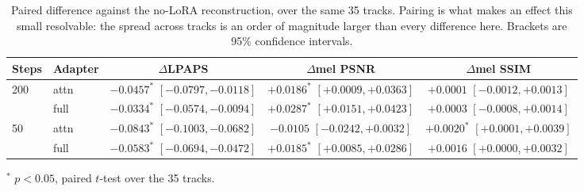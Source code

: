 \begin{table}[t]
  \centering
  \caption{Paired difference against the no-LoRA reconstruction, over the same 35 tracks.
    Pairing is what makes an effect this small resolvable: the spread across tracks is an order
    of magnitude larger than every difference here. Brackets are 95\% confidence intervals.}
  \label{tab:medleydb-reconstruction-paired}
  \begin{tabular}{ll ccc}
    \toprule
    Steps & Adapter & $\Delta$LPAPS & $\Delta$mel PSNR & $\Delta$mel SSIM \\
    \midrule
    \multirow{2}{*}{200}
      & attn   & $-0.0457^{*}$ {\scriptsize $[-0.0797, -0.0118]$} & $+0.0186^{*}$ {\scriptsize $[+0.0009, +0.0363]$} & $+0.0001$ {\scriptsize $[-0.0012, +0.0013]$} \\
      & full   & $-0.0334^{*}$ {\scriptsize $[-0.0574, -0.0094]$} & $+0.0287^{*}$ {\scriptsize $[+0.0151, +0.0423]$} & $+0.0003$ {\scriptsize $[-0.0008, +0.0014]$} \\
    \midrule
    \multirow{2}{*}{50}
      & attn   & $-0.0843^{*}$ {\scriptsize $[-0.1003, -0.0682]$} & $-0.0105$ {\scriptsize $[-0.0242, +0.0032]$} & $+0.0020^{*}$ {\scriptsize $[+0.0001, +0.0039]$} \\
      & full   & $-0.0583^{*}$ {\scriptsize $[-0.0694, -0.0472]$} & $+0.0185^{*}$ {\scriptsize $[+0.0085, +0.0286]$} & $+0.0016$ {\scriptsize $[+0.0000, +0.0032]$} \\
    \bottomrule
  \end{tabular}

  \vspace{0.4em}
  \parbox{\linewidth}{\footnotesize $^{*}$ $p < 0.05$, paired $t$-test over the 35 tracks.}
\end{table}
